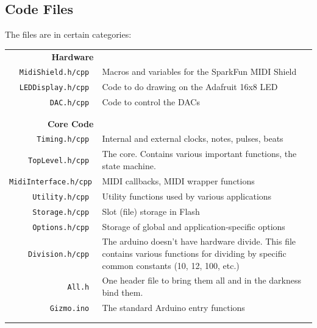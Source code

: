 \documentclass{article}
\begin{document}
\subsection{Code Files}

The files are in certain categories:

\noindent\begin{tabular}{r@{\hspace{2em}}p{4.7in}}
	\bf Hardware &\\
	\tt MidiShield.h/cpp	& Macros and variables for the SparkFun MIDI Shield \\ 
	\tt LEDDisplay.h/cpp	& Code to do drawing on the Adafruit 16x8 LED \\ 
	\tt DAC.h/cpp		& Code to control the DACs \\ 
\\
\\
	\bf Core Code  &\\
	\tt Timing.h/cpp	& 	Internal and external clocks, notes, pulses, beats \\ 
	\tt TopLevel.h/cpp	& 	The core.  Contains various important functions, the state machine. \\ 
	\tt MidiInterface.h/cpp	& MIDI callbacks, MIDI wrapper functions \\ 
	\tt Utility.h/cpp		& Utility functions used by various applications \\ 
	\tt Storage.h/cpp		& Slot (file) storage in Flash \\ 
	\tt Options.h/cpp		& Storage of global and application-specific options \\ 
	\tt Division.h/cpp		& The arduino doesn't have hardware divide.  This
				file contains various functions for dividing by
				specific common constants (10, 12, 100, etc.) \\ 
	\tt All.h		& 	One header file to bring them all and in the
				darkness bind them. \\ 
	\tt Gizmo.ino		& The standard Arduino entry functions \\ 
\\
\\


\end{tabular}
\end{document}
